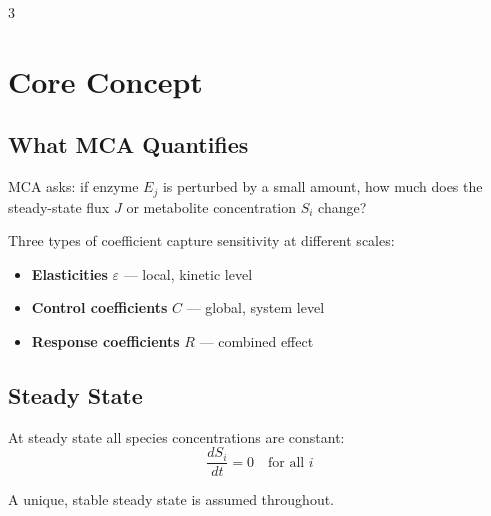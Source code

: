 \documentclass[10pt,landscape,a4paper]{article}
\begin{document}
\begin{multicols}{3}

\section{Core Concept}

\subsection{What MCA Quantifies}

MCA asks: if enzyme $E_j$ is perturbed by a small amount, how much does the
steady-state flux $J$ or metabolite concentration $S_i$ change?

\begin{center}
\end{center}

Three types of coefficient capture sensitivity at different scales:

\begin{itemize}
  \item \textbf{Elasticities} $\varepsilon$ --- local, kinetic level
  \item \textbf{Control coefficients} $C$ --- global, system level
  \item \textbf{Response coefficients} $R$ --- combined effect
\end{itemize}

\subsection{Steady State}

At steady state all species concentrations are constant:
\[
  \frac{dS_i}{dt} = 0 \quad \text{for all } i
\]

A unique, stable steady state is assumed throughout.


\end{multicols}
\end{document}
